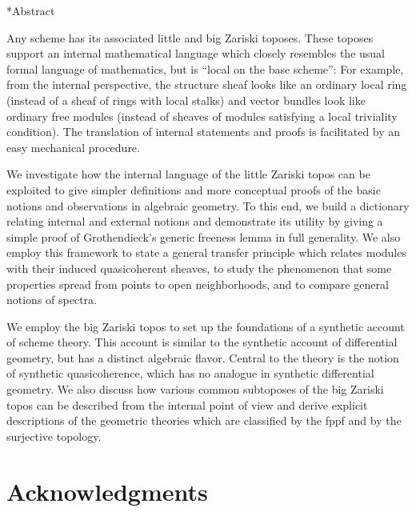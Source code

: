 \documentclass[10pt,reqno,a4paper]{amsbook}
\theoremstyle{definition}
\theoremstyle{plain}
\theoremstyle{remark}
\newcommand{\?}{\,{:}\,}
\renewcommand{\_}{\mathpunct{.}\,}
\newcommand{\nocontentsline}[3]{}
\newcommand{\tocless}[1]{\let\addcontentsline=\nocontentsline}
\begin{document}
{\tocless

\chapter*{Abstract}

Any scheme has its associated little and big Zariski toposes. These toposes
support an internal mathematical language which closely resembles the usual
formal language of mathematics, but is ``local on the base scheme'': For
example, from the internal perspective, the structure sheaf looks like an
ordinary local ring (instead of a sheaf of rings with local stalks) and vector
bundles look like ordinary free modules (instead of sheaves of modules
satisfying a local triviality condition). The translation of internal statements and
proofs is facilitated by an easy mechanical procedure.

We investigate how the internal language of the little Zariski topos
can be exploited to give simpler definitions and more conceptual
proofs of the basic notions and observations in algebraic geometry.
To this end, we build a dictionary relating internal and external notions and
demonstrate its utility by giving a simple proof of Grothendieck's generic
freeness lemma in full generality. We also employ this framework to state a
general transfer principle which relates modules with their induced quasicoherent
sheaves, to study the phenomenon that some
properties spread from points to open neighborhoods, and to compare general
notions of spectra.

We employ the big Zariski topos to set up the foundations of a synthetic account
of scheme theory. This account is similar to the synthetic account of
differential geometry, but has a distinct algebraic flavor. Central to the
theory is the notion of synthetic quasicoherence, which has no analogue in
synthetic differential geometry. We also discuss how various common subtoposes
of the big Zariski topos can be described from the internal point of view and
derive explicit descriptions of the geometric theories which are
classified by the fppf and by the surjective topology.



\chapter*{Acknowledgments}

}
\end{document}
